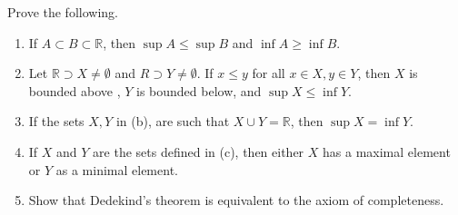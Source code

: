   \begin{exercise}
    Prove the following. 
    \begin{enumerate}
      \item If $A \subset B \subset \mathbb{R}$, then $\sup{A} \leq \sup{B}$ and $\inf{A} \geq \inf{B}$. 
      \item Let $\mathbb{R} \supset X \neq \emptyset$ and $R \supset Y \neq \emptyset$. If $x \leq y$ for all $x \in X, y \in Y$, then $X$ is bounded above , $Y$ is bounded below, and $\sup{X} \leq \inf{Y}$. 
      \item If the sets $X, Y$ in (b), are such that $X \cup Y = \mathbb{R}$, then $\sup{X} = \inf{Y}$. 
      \item If $X$ and $Y$ are the sets defined in (c), then either $X$ has a maximal element or $Y$ as a minimal element. 
      \item Show that Dedekind's theorem is equivalent to the axiom of completeness. 
    \end{enumerate}
  \end{exercise}

